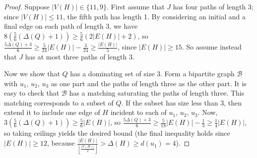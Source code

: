 \documentclass[12pt]{amsart}
\theoremstyle{plain}
\theoremstyle{definition}
\theoremstyle{remark}
\newcommand{\fancy}[1]{\mathcal{#1}}
\newcommand{\B}{\fancy{B}}
\newcommand{\floor}[1]{\left\lfloor#1\right\rfloor}
\begin{document}
\begin{proof}
Suppose $|V(H)|\in\{11,9\}$.  First assume that $J$ has four paths of length
3; since $|V(H)|\le 11$, the fifth path has length 1.
By considering an initial and a final edge on each path of length 3, we have
$8(\frac56(\Delta(Q)+1))\ge \frac56(2|E(H)|+2)$, so
$\frac{5\Delta(Q)+3}6\ge\frac5{24}|E(H)|-\frac3{24}\ge\frac{|E(H)|}5$, since
$|E(H)|\ge 15$.  So assume instead that $J$ has at most three paths of length 3.

Now we show that $Q$ has a dominating set of size 3.  Form a bipartite
graph $\B$ with $u_1$, $u_2$, $u_3$ as one part and the paths of length three as
the other part.  It is easy to check that $\B$ has a matching saturating the
paths of length three.  This matching corresponds to a subset of $Q$.  If the
subset has size less than 3, then extend it to include one edge of $H$ incident to
each of $u_1$, $u_2$, $u_3$.  Now, $3(\frac56(\Delta(Q)+1))\ge \frac56|E(H)|$,
so $\frac{5\Delta(Q)+3}6\ge \frac5{18}|E(H)|-\frac13\ge\frac14|E(H)|$, so taking
ceilings yields the desired bound (the final inequality holds since $|E(H)|\ge
12$, because $\frac{|E(H)|}{\floor{\frac{|V(H)|}2}}>\Delta(H)\ge d(u_1)=4$).
\end{proof}





\end{document}

